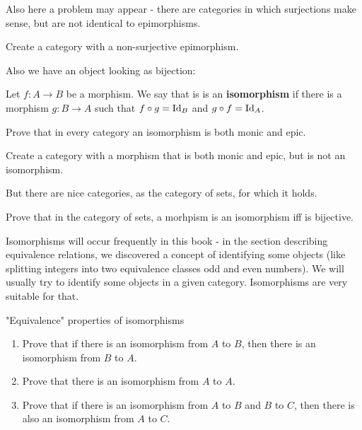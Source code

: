 Also here a problem may appear - there are categories in which surjections make sense, but are not identical to epimorphisms.

\begin{exercise}
  Create a category with a non-surjective epimorphism.
\end{exercise}

Also we have an object looking as bijection:

\begin{definition}
  Let $f: A\to B$ be a morphism. We say that is is an \textbf{isomorphism} if there is a morphism $g:B\to A$ such that $f\circ g=\text{Id}_B$ and $g\circ f=\text{Id}_A$.
\end{definition}

\begin{exercise}
  Prove that in every category an isomorphism is both monic and epic.
\end{exercise}

\begin{exercise}
  Create a category with a morphism that is both monic and epic, but is not an isomorphism.
\end{exercise}

But there are nice categories, as the category of sets, for which it holds.

\begin{exercise}
  Prove that in the category of sets, a morhpism is an isomorphism iff is bijective.
\end{exercise}

Isomorphisms will occur frequently in this book - in the section describing equivalence relations, we discovered a concept of identifying some objects (like splitting integers into two equivalence
classes odd and even numbers). We will usually try to identify some objects in a given category. Isomorphisms are very suitable for that.

\begin{exercise}
  "Equivalence" properties of isomorphisms
  \begin{enumerate}
    \item Prove that if there is an isomorphism from $A$ to $B$, then there is an isomorphism from $B$ to $A$.
    \item Prove that there is an isomorphism from $A$ to $A$.
    \item Prove that if there is an isomorphism from $A$ to $B$ and $B$ to $C$, then there is also an isomorphism from $A$ to $C$.
  \end{enumerate}
\end{exercise}

